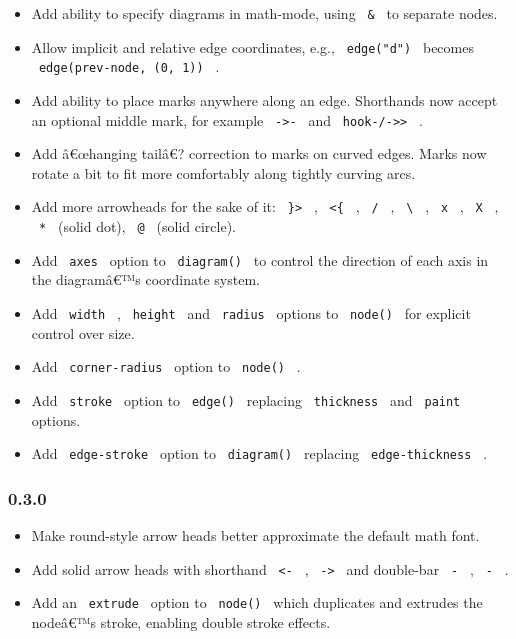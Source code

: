 \begin{itemize}
\tightlist
\item
  Add ability to specify diagrams in math-mode, using \texttt{\ \&\ } to
  separate nodes.
\item
  Allow implicit and relative edge coordinates, e.g.,
  \texttt{\ edge("d")\ } becomes \texttt{\ edge(prev-node,\ (0,\ 1))\ }
  .
\item
  Add ability to place marks anywhere along an edge. Shorthands now
  accept an optional middle mark, for example
  \texttt{\ \textbar{}-\textgreater{}-\textbar{}\ } and
  \texttt{\ hook-/-\textgreater{}\textgreater{}\ } .
\item
  Add â€œhanging tailâ€? correction to marks on curved edges. Marks now
  rotate a bit to fit more comfortably along tightly curving arcs.
\item
  Add more arrowheads for the sake of it: \texttt{\ \}\textgreater{}\ }
  , \texttt{\ \textless{}\{\ } , \texttt{\ /\ } ,
  \texttt{\ \textbackslash{}\ } , \texttt{\ x\ } , \texttt{\ X\ } ,
  \texttt{\ *\ } (solid dot), \texttt{\ @\ } (solid circle).
\item
  Add \texttt{\ axes\ } option to \texttt{\ diagram()\ } to control the
  direction of each axis in the diagramâ€™s coordinate system.
\item
  Add \texttt{\ width\ } , \texttt{\ height\ } and \texttt{\ radius\ }
  options to \texttt{\ node()\ } for explicit control over size.
\item
  Add \texttt{\ corner-radius\ } option to \texttt{\ node()\ } .
\item
  Add \texttt{\ stroke\ } option to \texttt{\ edge()\ } replacing
  \texttt{\ thickness\ } and \texttt{\ paint\ } options.
\item
  Add \texttt{\ edge-stroke\ } option to \texttt{\ diagram()\ }
  replacing \texttt{\ edge-thickness\ } .
\end{itemize}

\subsubsection{0.3.0}\label{section-9}

\begin{itemize}
\tightlist
\item
  Make round-style arrow heads better approximate the default math font.
\item
  Add solid arrow heads with shorthand
  \texttt{\ \textless{}\textbar{}-\ } ,
  \texttt{\ -\textbar{}\textgreater{}\ } and double-bar
  \texttt{\ \textbar{}\textbar{}-\ } ,
  \texttt{\ -\textbar{}\textbar{}\ } .
\item
  Add an \texttt{\ extrude\ } option to \texttt{\ node()\ } which
  duplicates and extrudes the nodeâ€™s stroke, enabling double stroke
  effects.
\end{itemize}

